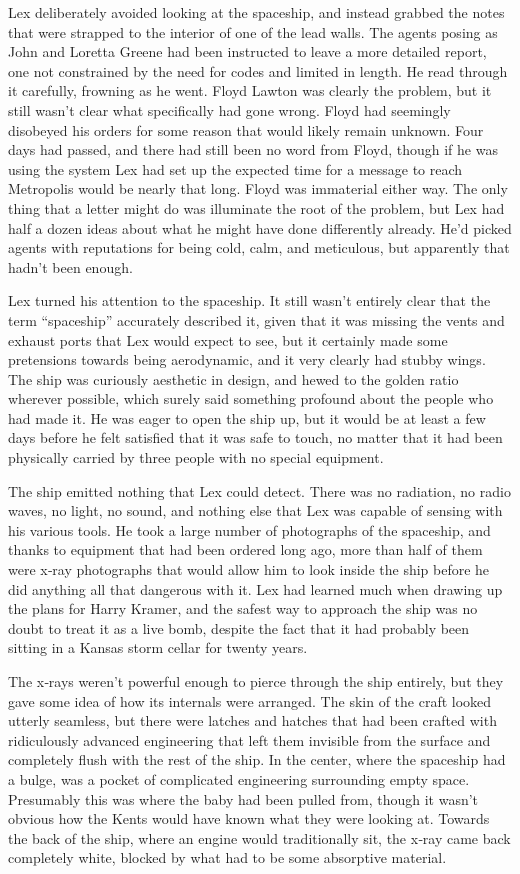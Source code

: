 Lex deliberately avoided looking at the spaceship, and instead grabbed
the notes that were strapped to the interior of one of the lead walls.
The agents posing as John and Loretta Greene had been instructed to
leave a more detailed report, one not constrained by the need for codes
and limited in length. He read through it carefully, frowning as he
went. Floyd Lawton was clearly the problem, but it still wasn't clear
what specifically had gone wrong. Floyd had seemingly disobeyed his
orders for some reason that would likely remain unknown. Four days had
passed, and there had still been no word from Floyd, though if he was
using the system Lex had set up the expected time for a message to reach
Metropolis would be nearly that long. Floyd was immaterial either way.
The only thing that a letter might do was illuminate the root of the
problem, but Lex had half a dozen ideas about what he might have done
differently already. He'd picked agents with reputations for being cold,
calm, and meticulous, but apparently that hadn't been enough.

Lex turned his attention to the spaceship. It still wasn't entirely
clear that the term ``spaceship'' accurately described it, given that it
was missing the vents and exhaust ports that Lex would expect to see,
but it certainly made some pretensions towards being aerodynamic, and it
very clearly had stubby wings. The ship was curiously aesthetic in
design, and hewed to the golden ratio wherever possible, which surely
said something profound about the people who had made it. He was eager
to open the ship up, but it would be at least a few days before he felt
satisfied that it was safe to touch, no matter that it had been
physically carried by three people with no special equipment.

The ship emitted nothing that Lex could detect. There was no radiation,
no radio waves, no light, no sound, and nothing else that Lex was
capable of sensing with his various tools. He took a large number of
photographs of the spaceship, and thanks to equipment that had been
ordered long ago, more than half of them were x‐ray photographs that
would allow him to look inside the ship before he did anything all that
dangerous with it. Lex had learned much when drawing up the plans for
Harry Kramer, and the safest way to approach the ship was no doubt to
treat it as a live bomb, despite the fact that it had probably been
sitting in a Kansas storm cellar for twenty years.

The x‐rays weren't powerful enough to pierce through the ship entirely,
but they gave some idea of how its internals were arranged. The skin of
the craft looked utterly seamless, but there were latches and hatches
that had been crafted with ridiculously advanced engineering that left
them invisible from the surface and completely flush with the rest of
the ship. In the center, where the spaceship had a bulge, was a pocket
of complicated engineering surrounding empty space. Presumably this was
where the baby had been pulled from, though it wasn't obvious how the
Kents would have known what they were looking at. Towards the back of
the ship, where an engine would traditionally sit, the x‐ray came back
completely white, blocked by what had to be some absorptive material.

